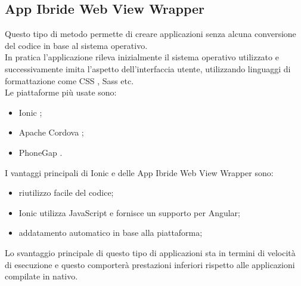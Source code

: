 \subsection{App Ibride Web View Wrapper}
Questo tipo di metodo \cite{differenza,apptonative} permette di creare applicazioni senza alcuna conversione del codice in base al sistema operativo.\\
 In pratica l'applicazione rileva inizialmente il sistema operativo utilizzato e successivamente imita l'aspetto dell'interfaccia utente, utilizzando linguaggi di formattazione come CSS \cite{css}, Sass \cite{sass} etc. \\
Le piattaforme più usate sono:
\begin{itemize}
\item Ionic \cite{ionic}; 
\item Apache Cordova \cite{apache}; 
\item PhoneGap \cite{phonegap}.
\end{itemize}
I vantaggi principali di Ionic e delle App Ibride Web View Wrapper sono:
\begin{itemize}
	\item riutilizzo facile del codice; 
	\item Ionic utilizza JavaScript e fornisce un supporto per Angular;
	\item addatamento automatico in base alla piattaforma; 
\end{itemize}
Lo svantaggio principale di questo tipo di applicazioni sta in termini di velocità di esecuzione e questo comporterà prestazioni inferiori rispetto alle applicazioni compilate in nativo.\\

